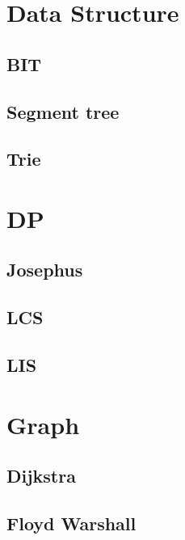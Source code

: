 \section{Data Structure}
        \subsection{BIT}
                
        \subsection{Segment tree}
                
        \subsection{Trie}
                

\section{DP} 
        \subsection{Josephus}
                
        \subsection{LCS}
                
        \subsection{LIS}
                  

\section{Graph}
        \subsection{Dijkstra}
                
        \subsection{Floyd Warshall}
                

